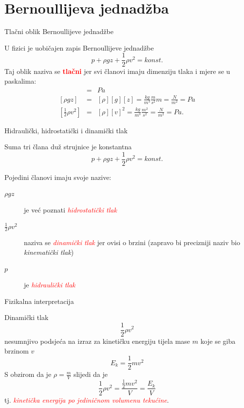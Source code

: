 \documentclass[croatian]{beamer}
\begin{document}
\section{Bernoullijeva jednadžba}

\begin{frame}{Tlačni oblik Bernoullijeve jednadžbe}

U fizici je uobičajen zapis Bernoullijeve jednadžbe
\[
p+\rho gz+\frac{1}{2}\rho v^{2}=konst.
\]
Taj oblik naziva se \textbf{\textcolor{red}{tlačni}} jer svi članovi
imaju dimenziju tlaka i mjere se u paskalima:
\begin{eqnarray*}
[p] & = & Pa\\
{}[\rho gz] & = & [\rho][g][z]=\frac{kg}{m^{3}}\frac{m}{s^{2}}m=\frac{N}{m^{2}}=Pa\\
{}[\frac{1}{2}\rho v^{2}] & = & [\rho][v]^{2}=\frac{kg}{m^{3}}\frac{m^{2}}{s^{2}}=\frac{N}{m^{2}}=Pa.
\end{eqnarray*}
\end{frame}

\begin{frame}{Hidraulički, hidrostatički i dinamički tlak}

Suma tri člana duž strujnice je konstantna
\[
p+\rho gz+\frac{1}{2}\rho v^{2}=konst.
\]
\begin{block}{Pojedini članovi imaju svoje nazive:}
\begin{description}
\item [{$\rho gz$}] je već poznati \textcolor{red}{\emph{hidrostatički
tlak}}
\item [{$\frac{1}{2}\rho v^{2}$}] naziva se \textcolor{red}{\emph{dinamički
tlak}} jer ovisi o brzini (zapravo bi precizniji naziv bio \emph{kinematički
tlak})
\item [{$p$}] je \textcolor{red}{\emph{hidraulički tlak}}
\end{description}
\end{block}
\end{frame}

\begin{frame}{Fizikalna interpretacija}

Dinamički tlak
\[
\frac{1}{2}\rho v^{2}
\]
nesumnjivo podsjeća na izraz za kinetičku energiju tijela mase $m$
koje se giba brzinom $v$
\[
E_{k}=\frac{1}{2}mv^{2}
\]
S obzirom da je $\rho=\frac{m}{V}$ slijedi da je
\[
\frac{1}{2}\rho v^{2}=\frac{\frac{1}{2}mv^{2}}{V}=\frac{E_{k}}{V}
\]
tj. \textcolor{red}{\emph{kinetička energija po jediničnom volumenu
tekućine}}.
\end{frame}
\end{document}
